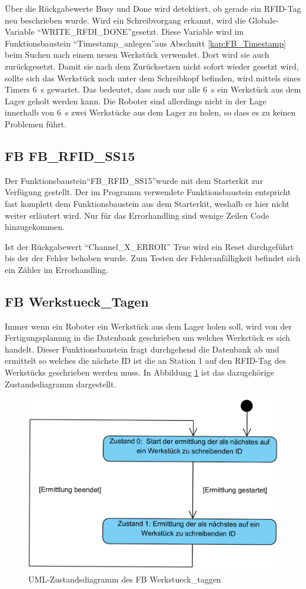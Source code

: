 Über die Rückgabewerte Busy und Done wird detektiert, ob gerade ein RFID-Tag neu beschrieben wurde. Wird ein Schreibvorgang erkannt, wird die Globale-Variable "`WRITE\_RFDI\_DONE"'gesetzt. Diese Variable wird im Funktionsbaustein "`Time\-sta\-mp\_an\-legen"'aus Abschnitt \ref{kap:FB_Timestamp} beim Suchen nach einem neuen Werkstück verwendet. Dort wird sie auch zurückgesetzt. Damit sie nach dem Zurücksetzen nicht sofort wieder gesetzt wird, sollte sich das Werkstück noch unter dem Schreibkopf befinden, wird mittels eines Timers \SI{6}{\second} gewartet. Das bedeutet, dass auch nur alle  \SI{6}{\second} ein Werkstück aus dem Lager geholt werden kann. Die Roboter sind allerdings nicht in der Lage innerhalb von \SI{6}{\second} zwei Werkstücke aus dem Lager zu holen, so dass es zu keinen Problemen führt.

\subsection{FB FB\_RFID\_SS15}
Der Funktionsbaustein"`FB\_RFID\_SS15"'wurde mit dem Starterkit zur Verfügung gestellt. Der im Programm verwendete Funktionsbaustein entspricht fast komplett dem Funktionsbaustein aus dem Starterkit, weshalb er hier nicht weiter erläutert wird. Nur für das Errorhandling sind wenige Zeilen Code hinzugekommen. 

Ist der Rückgabewert "`Channel\_X\_ERROR"'  True wird ein Reset durchgeführt bis der der Fehler behoben wurde. Zum Testen der Fehleranfälligkeit befindet sich ein Zähler im Errorhandling. 

\subsection{FB Werkstueck\_Tagen}\label{kap:FB_werkstueck_taggen}
Immer wenn ein Roboter ein Werkstück aus dem Lager holen soll, wird von der Fertigungsplanung in die Datenbank geschrieben um welches Werkstück es sich handelt. Dieser Funktionsbaustein fragt durchgehend die Datenbank ab und ermittelt so welches die nächste ID ist die an Station 1 auf den RFID-Tag des Werkstücks geschrieben werden muss. In Abbildung \ref{fig:FB_Werkstueck_taggen} ist das dazugehörige Zustandsdiagramm dargestellt.
\begin{figure}[h]
	    \centering
	    \includegraphics[width=0.7\linewidth]{Bilder/Zustandsdiagramme/taggen.png}
        \caption{UML-Zustandsdiagramm des FB Werkstueck\_taggen}
        \label{fig:FB_Werkstueck_taggen}
\end{figure}

